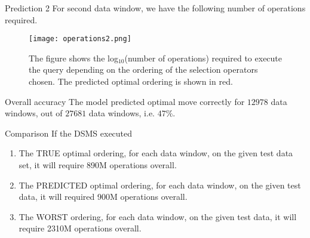 \begin{frame}{Prediction 2}
    For second data window, we have the following number of operations required.
    \begin{figure}
        \centering
        \texttt{[image: operations2.png]}\\
        \caption{The figure shows the log$_{10}$(number of operations) required to execute the query depending on the ordering of the selection operators chosen. The predicted optimal ordering is shown in red.}
        \label{fig:operations2}
    \end{figure}
\end{frame}

\begin{frame}{Overall accuracy}
    The model predicted optimal move correctly for $12978$ data windows, out of $27681$ data windows, i.e. $47\%$.\\
\end{frame}

\begin{frame}{Comparison}
    If the DSMS executed 
    \begin{enumerate}
        \item The TRUE optimal ordering, for each data window, on the given test data set, it will require 890M operations overall.
        \item The PREDICTED optimal ordering, for each data window, on the given test data, it will required 900M operations overall.
        \item The WORST ordering, for each data window, on the given test data, it will require 2310M operations overall.
    \end{enumerate}
\end{frame}

